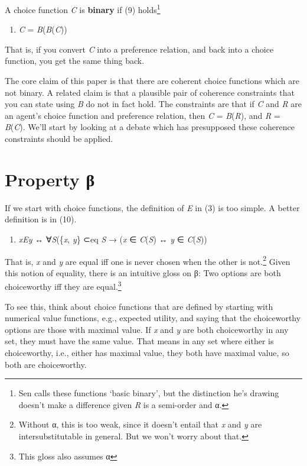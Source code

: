 \documentclass[
  11pt,
  letterpaper,
  DIV=11,
  numbers=noendperiod,
  twoside]{scrartcl}
\providecommand{\tightlist}{%
  \setlength{\itemsep}{0pt}\setlength{\parskip}{0pt}}
\begin{document}
A choice function \emph{C} is \textbf{binary} if (9) holds\footnote{Sen
  calls these functions `basic binary', but the distinction he's drawing
  doesn't make a difference given \emph{R} is a semi-order and α.}

\begin{enumerate}
\def\labelenumi{(\arabic{enumi})}
\setcounter{enumi}{8}
\tightlist
\item
  \emph{C} = \emph{B}(\emph{B}(\emph{C}))
\end{enumerate}

That is, if you convert \emph{C} into a preference relation, and back
into a choice function, you get the same thing back.

The core claim of this paper is that there are coherent choice functions
which are not binary. A related claim is that a plausible pair of
coherence constraints that you can state using \emph{B} do not in fact
hold. The constraints are that if \emph{C} and \emph{R} are an agent's
choice function and preference relation, then \emph{C} =
\emph{B}(\emph{R}), and \emph{R} = \emph{B}(\emph{C}). We'll start by
looking at a debate which has presupposed these coherence constraints
should be applied.

\section{Property β}\label{property-ux3b2}

If we start with choice functions, the definition of \emph{E} in (3) is
too simple. A better definition is in (10).

\begin{enumerate}
\def\labelenumi{(\arabic{enumi})}
\setcounter{enumi}{9}
\tightlist
\item
  \emph{xEy} ↔ ∀\emph{S}(\{\emph{x}, \emph{y}\} ⊂eq \emph{S} → (\emph{x}
  ∈ \emph{C}(\emph{S}) ↔ \emph{y} ∈ \emph{C}(\emph{S}))
\end{enumerate}

That is, \emph{x} and \emph{y} are equal iff one is never chosen when
the other is not.\footnote{Without α, this is too weak, since it doesn't
  entail that \emph{x} and \emph{y} are intersubstitutable in general.
  But we won't worry about that.} Given this notion of equality, there
is an intuitive gloss on β: Two options are both choiceworthy iff they
are equal.\footnote{This gloss also assumes α}

To see this, think about choice functions that are defined by starting
with numerical value functions, e.g., expected utility, and saying that
the choiceworthy options are those with maximal value. If \emph{x} and
\emph{y} are both choiceworthy in any set, they must have the same
value. That means in any set where either is choiceworthy, i.e., either
has maximal value, they both have maximal value, so both are
choiceworthy.
\end{document}
